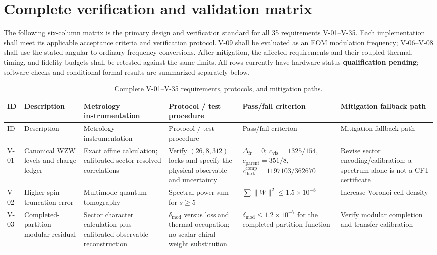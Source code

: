 \documentclass[11pt,a4paper]{article}
\begin{document}
\section{Complete verification and validation matrix}
\label{sec:vv}
The following six-column matrix is the primary design and verification standard for all 35
requirements V-01--V-35. Each implementation shall meet its applicable acceptance
criteria and verification protocol. V-09 shall be evaluated as an EOM modulation
frequency; V-06--V-08 shall use the stated angular-to-ordinary-frequency conversions.
After mitigation, the affected requirements and their coupled thermal, timing, and
fidelity budgets shall be retested against the same limits. All rows currently
have hardware status \textbf{qualification pending}; software checks and conditional
formal results are summarized separately below.
\begin{landscape}
\small
\setlength{\tabcolsep}{3pt}
\begin{longtable}{@{}P{0.85cm}P{4.05cm}P{4.15cm}P{4.7cm}P{3.6cm}P{4.3cm}@{}}
\caption{Complete V-01--V-35 requirements, protocols, and mitigation paths.}\label{tab:vv}\\
\toprule ID & Description & Metrology instrumentation & Protocol / test procedure & Pass/fail criterion & Mitigation fallback path\\\midrule\endfirsthead
\toprule ID & Description & Metrology instrumentation & Protocol / test procedure & Pass/fail criterion & Mitigation fallback path\\\midrule\endhead
\bottomrule\endfoot
V-01 & Canonical WZW levels and charge ledger & Exact affine calculation; calibrated sector-resolved correlations & Verify $(26,8,312)$ locks and specify the physical observable and uncertainty & $\Delta_{\mathrm{fr}}=0$; $c_{\mathrm{vis}}=1325/154$, $c_{\mathrm{parent}}=351/8$, $c_{\mathrm{dark}}^{\mathrm{comp}}=1197103/362670$ & Revise sector encoding/calibration; a spectrum alone is not a CFT certificate\\
V-02 & Higher-spin truncation error & Multimode quantum tomography & Spectral power sum for $s\ge5$ & $\sum\|W\|^2\le1.5\times10^{-8}$ & Increase Voronoi cell density\\
V-03 & Completed-partition modular residual & Sector character calculation plus calibrated observable reconstruction & $\delta_{\mathrm{mod}}$ versus loss and thermal occupation; no scalar chiral-weight substitution & $\delta_{\mathrm{mod}}\le1.2\times10^{-7}$ for the completed partition function & Verify modular completion and transfer calibration\\

\end{longtable}
\end{landscape}
\end{document}
